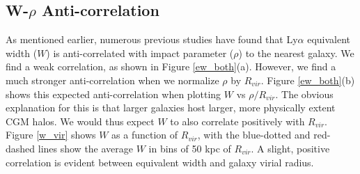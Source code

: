 \documentclass[iop]{emulateapj-rtx4}
\begin{document}


\subsection{W-$\rho$ Anti-correlation}
As mentioned earlier, numerous previous studies have found that Ly$\alpha$ equivalent width ($W$) is anti-correlated with impact parameter ($\rho$) to the nearest galaxy. We find a weak correlation, as shown in Figure \ref{ew_both}(a). However, we find a much stronger anti-correlation when we normalize $\rho$ by $R_{vir}$. Figure \ref{ew_both}(b) shows this expected anti-correlation when plotting $W$ vs $\rho/R_{vir}$. The obvious explanation for this is that larger galaxies host larger, more physically extent CGM halos. We would thus expect $W$ to also correlate positively with $R_{vir}$. Figure \ref{w_vir} shows $W$ as a function of $R_{vir}$, with the blue-dotted and red-dashed lines show the average $W$ in bins of 50 kpc of $R_{vir}$. A slight, positive correlation is evident between equivalent width and galaxy virial radius.


\end{document}
